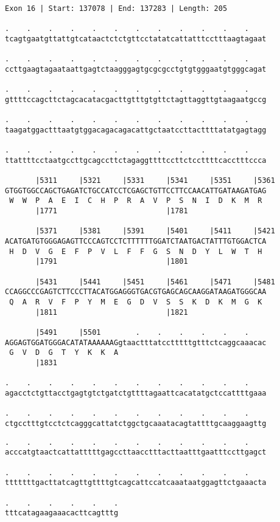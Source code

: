 \documentclass{article}
\begin{document}
\newpage
\begin{Verbatim}[fontfamily=courier]
Exon 16 | Start: 137078 | End: 137283 | Length: 205

.    .    .    .    .    .    .    .    .    .    .    .    
tcagtgaatgttattgtcataactctctgttcctatatcattatttcctttaagtagaat

.    .    .    .    .    .    .    .    .    .    .    .    
ccttgaagtagaataattgagtctaagggagtgcgcgcctgtgtgggaatgtgggcagat

.    .    .    .    .    .    .    .    .    .    .    .    
gttttccagcttctagcacatacgacttgtttgtgttctagttaggttgtaagaatgccg

.    .    .    .    .    .    .    .    .    .    .    .    
taagatggactttaatgtggacagacagacattgctaatccttacttttatatgagtagg

.    .    .    .    .    .    .    .    .    .    .    .    
ttattttcctaatgccttgcagccttctagaggttttccttctccttttcacctttccca

       |5311     |5321     |5331     |5341     |5351     |5361
GTGGTGGCCAGCTGAGATCTGCCATCCTCGAGCTGTTCCTTCCAACATTGATAAGATGAG
 W  W  P  A  E  I  C  H  P  R  A  V  P  S  N  I  D  K  M  R 
       |1771                         |1781                  

       |5371     |5381     |5391     |5401     |5411     |5421
ACATGATGTGGGAGAGTTCCCAGTCCTCTTTTTTGGATCTAATGACTATTTGTGGACTCA
 H  D  V  G  E  F  P  V  L  F  F  G  S  N  D  Y  L  W  T  H 
       |1791                         |1801                  

       |5431     |5441     |5451     |5461     |5471     |5481
CCAGGCCCGAGTCTTCCCTTACATGGAGGGTGACGTGAGCAGCAAGGATAAGATGGGCAA
 Q  A  R  V  F  P  Y  M  E  G  D  V  S  S  K  D  K  M  G  K 
       |1811                         |1821                  

       |5491     |5501        .    .    .    .    .    .    
AGGAGTGGATGGGACATATAAAAAAGgtaactttatcctttttgtttctcaggcaaacac
 G  V  D  G  T  Y  K  K  A                                  
       |1831                                                

.    .    .    .    .    .    .    .    .    .    .    .    
agacctctgttacctgagtgtctgatctgttttagaattcacatatgctccattttgaaa

.    .    .    .    .    .    .    .    .    .    .    .    
ctgcctttgtcctctcagggcattatctggctgcaaatacagtattttgcaaggaagttg

\end{Verbatim}
\newpage
\begin{Verbatim}[fontfamily=courier]
.    .    .    .    .    .    .    .    .    .    .    .    
acccatgtaactcattatttttgagccttaacctttacttaatttgaatttccttgagct

.    .    .    .    .    .    .    .    .    .    .    .    
tttttttgacttatcagttgttttgtcagcattccatcaaataatggagttctgaaacta

.    .    .    .    .    .
tttcatagaagaaacacttcagtttg
\end{Verbatim}
\end{document}
